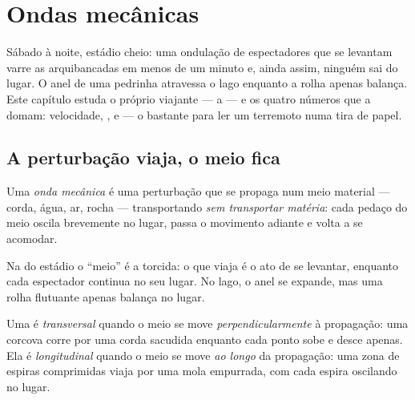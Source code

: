 \chapter{Ondas mecânicas}\label{ch:g12:mechanical-waves}

Sábado à noite, estádio cheio: uma ondulação de espectadores que se
levantam varre as arquibancadas em menos de um minuto e, ainda assim,
ninguém sai do lugar. O anel de uma pedrinha atravessa o lago enquanto a
rolha apenas balança. Este capítulo estuda o próprio viajante --- a 
--- e os quatro números que a domam: velocidade, ,  e
 --- o bastante para ler um terremoto numa tira de
papel.

\section{A perturbação viaja, o meio fica}

\begin{definition}\label{def:g12:mechanical-waves:wave}
Uma \emph{onda mecânica} é uma perturbação que se
propaga num meio material --- corda, água, ar, rocha --- transportando
 \emph{sem transportar matéria}: cada pedaço do meio oscila
brevemente no lugar, passa o movimento adiante e volta a se acomodar.
\end{definition}

\begin{example}\label{ex:g12:mechanical-waves:transport}
Na  do estádio o ``meio'' é a torcida: o que viaja é o ato de se
levantar, enquanto cada espectador continua no seu lugar. No lago, o anel
se expande, mas uma rolha flutuante apenas balança no lugar.
\end{example}

\begin{definition}\label{def:g12:mechanical-waves:transverse}
Uma  é \emph{transversal} quando o meio se
move \emph{perpendicularmente} à propagação: uma corcova corre por uma
corda sacudida enquanto cada ponto sobe e desce apenas. Ela é
\emph{longitudinal} quando o meio se move
\emph{ao longo} da propagação: uma zona de espiras comprimidas viaja por
uma mola empurrada, com cada espira oscilando no lugar.
\end{definition}


